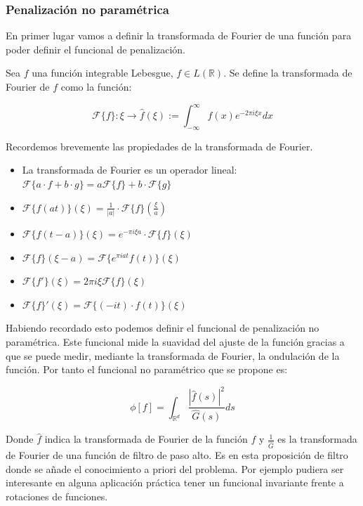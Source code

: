 \subsubsection{Penalización no paramétrica}

En primer lugar vamos a definir la transformada de Fourier de una función para poder definir el funcional de penalización. 

\begin{definicion}
	Sea $f$ una función integrable Lebesgue, $f\in L(\mathbb{R})$. Se define la transformada de Fourier de $f$ como la función:
	
	$$\mathcal{F}\{f\} : \xi \rightarrow \hat{f}(\xi) := \int_{-\infty}^{\infty}f(x)e^{-2\pi i\xi x}dx$$
\end{definicion}

Recordemos brevemente las propiedades de la transformada de Fourier.

\begin{itemize}
	\item La transformada de Fourier es un operador lineal: $\mathcal{F}\{a\cdot f + b\cdot g\} = a\mathcal{F}\{f\} + b\cdot \mathcal{F}\{g\}$
	\item $\mathcal{F}\{f(at)\}(\xi) = \frac{1}{|a|}\cdot \mathcal{F}\{f\}(\frac{\xi}{a})$
	\item $\mathcal{F}\{f(t-a)\}(\xi) = e^{-\pi i\xi a}\cdot \mathcal{F}\{f\}(\xi)$
	\item $\mathcal{F}\{f\}(\xi -a) = \mathcal{F}\{e^{\pi iat}f(t)\}(\xi)$
	\item $\mathcal{F}\{f'\}(\xi) = 2\pi i\xi \mathcal{F}\{f\}(\xi)$
	\item $\mathcal{F}\{f\}'(\xi) = \mathcal{F}\{(-it)\cdot f(t)\}(\xi)$
\end{itemize}

Habiendo recordado esto podemos definir el funcional de penalización no paramétrica. Este funcional mide la suavidad del ajuste de la función gracias a que se puede medir, mediante la transformada de Fourier, la ondulación de la función. Por tanto el funcional no paramétrico que se propone es:

$$\phi [f] = \int_{\mathbb{R}^d}\frac{|\hat{f}(s)|^2}{\hat{G}(s)}ds$$

Donde $\hat{f}$ indica la transformada de Fourier de la función $f$ y $\frac{1}{\hat{G}}$ es la transformada de Fourier de una función de filtro de paso alto. Es en esta proposición de filtro donde se añade el conocimiento a priori del problema. Por ejemplo pudiera ser interesante en alguna aplicación práctica tener un funcional invariante frente a rotaciones de funciones.

